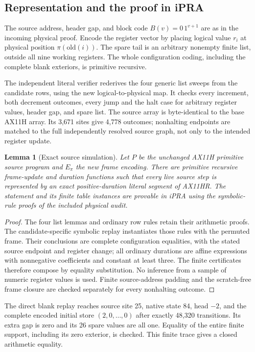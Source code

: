 \documentclass[11pt,letterpaper]{article}
\newtheorem{lemma}[theorem]{Lemma}
\begin{document}
\subsection{Representation and the proof in iPRA}

The source address, header gap, and block code $B(v)=0\,1^{v+1}$ are as in
the incoming physical proof. Encode the register vector by placing logical
value $r_i$ at physical position $\pi(\mathrm{old}(i))$. The spare tail is
an arbitrary nonempty finite list, outside all nine working registers.
The whole configuration coding, including the complete blank exteriors,
is primitive recursive.

The independent literal verifier rederives the four generic list sweeps
from the candidate rows, using the new logical-to-physical map. It checks
every increment, both decrement outcomes, every jump and the halt case
for arbitrary register values, header gap, and spare list. The source
array is byte-identical to the base AX11H array. Its 3,671 sites give 4,778
outcomes; nonhalting endpoints are matched to the full independently
resolved source graph, not only to the intended register update.

\begin{lemma}[Exact source simulation]
Let $P$ be the unchanged AX11H primitive source program and $E_\pi$
the new frame encoding. There are primitive recursive frame-update and
duration functions such that every live source step is represented by
an exact positive-duration literal segment of AX11HR. The statement and
its finite table instances are provable in iPRA using the symbolic-rule
proofs of the included physical audit.
\end{lemma}
\begin{proof}
The four list lemmas and ordinary row rules retain their arithmetic
proofs. The candidate-specific symbolic replay instantiates those rules
with the permuted frame. Their conclusions are complete configuration
equalities, with the stated source endpoint and register change; all
ordinary durations are affine expressions with nonnegative coefficients
and constant at least three. The finite certificates therefore compose
by equality substitution. No inference from a sample of numeric register
values is used. Finite source-address padding and the scratch-free frame
closure are checked separately for every nonhalting outcome.
\end{proof}

The direct blank replay reaches source site 25, native state 84, head $-2$,
and the complete encoded initial store $(2,0,\ldots,0)$ after exactly
48,320 transitions. Its extra gap is zero and its 26 spare values are all
one. Equality of the entire finite support, including its zero exterior,
is checked. This finite trace gives a closed arithmetic equality.
\end{document}
